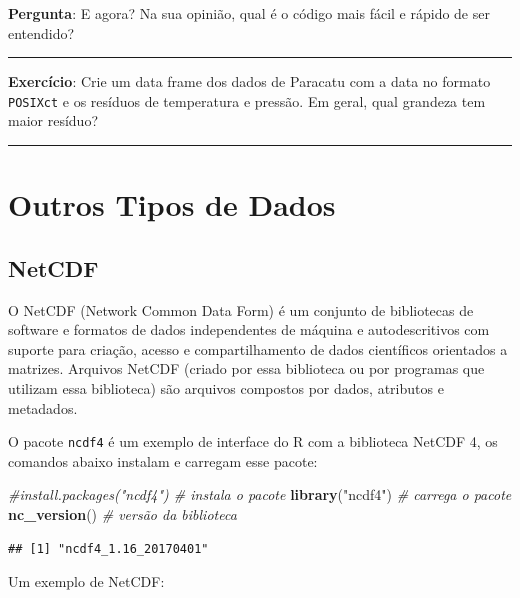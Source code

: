 \documentclass[]{book}
\newenvironment{Shaded}{\begin{snugshade}}{\end{snugshade}}
\newcommand{\KeywordTok}[1]{\textcolor[rgb]{0.13,0.29,0.53}{\textbf{#1}}}
\newcommand{\StringTok}[1]{\textcolor[rgb]{0.31,0.60,0.02}{#1}}
\newcommand{\CommentTok}[1]{\textcolor[rgb]{0.56,0.35,0.01}{\textit{#1}}}
\newcommand{\NormalTok}[1]{#1}
\theoremstyle{definition}
\theoremstyle{definition}
\theoremstyle{definition}
\theoremstyle{remark}
\begin{document}
{\textbf{Pergunta}: E agora? Na sua opinião, qual é o código mais fácil
e rápido de ser entendido?}

\begin{center}\rule{0.5\linewidth}{\linethickness}\end{center}

{\textbf{Exercício}: Crie um data frame dos dados de Paracatu com a data
no formato \texttt{POSIXct} e os resíduos de temperatura e pressão. Em
geral, qual grandeza tem maior resíduo?}

\begin{center}\rule{0.5\linewidth}{\linethickness}\end{center}

\section{Outros Tipos de Dados}\label{outros-tipos-de-dados}

\subsection{NetCDF}\label{netcdf}

O NetCDF (Network Common Data Form) é um conjunto de bibliotecas de
software e formatos de dados independentes de máquina e autodescritivos
com suporte para criação, acesso e compartilhamento de dados científicos
orientados a matrizes. Arquivos NetCDF (criado por essa biblioteca ou
por programas que utilizam essa biblioteca) são arquivos compostos por
dados, atributos e metadados.

O pacote \texttt{ncdf4} é um exemplo de interface do R com a biblioteca
NetCDF 4, os comandos abaixo instalam e carregam esse pacote:

\begin{Shaded}
\begin{Highlighting}[]
\CommentTok{#install.packages("ncdf4") # instala o pacote}
\KeywordTok{library}\NormalTok{(}\StringTok{"ncdf4"}\NormalTok{)           }\CommentTok{# carrega o pacote}
\KeywordTok{nc_version}\NormalTok{()               }\CommentTok{# versão da biblioteca}
\end{Highlighting}
\end{Shaded}

\begin{verbatim}
## [1] "ncdf4_1.16_20170401"
\end{verbatim}

Um exemplo de NetCDF:
\end{document}
